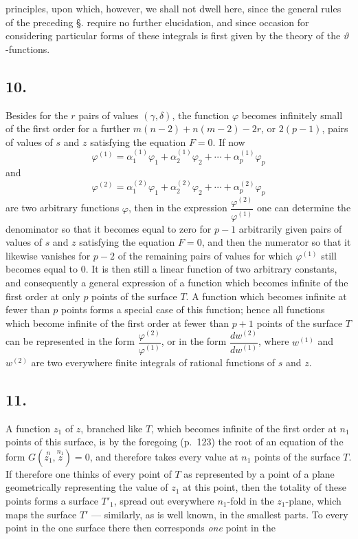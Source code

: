 \documentclass{article}
\begin{document}
principles, upon which, however, we shall not dwell here, since the general rules of the preceding §. require no further elucidation, and since occasion for considering particular forms of these integrals is first given by the theory of the $\vartheta$-functions.

\subsection*{10.}

Besides for the $r$ pairs of values $(\gamma, \delta)$, the function $\varphi$ becomes infinitely small of the first order for a further $m(n-2) + n(m-2) - 2r$, or $2(p-1)$, pairs of values of $s$ and $z$ satisfying the equation $F = 0$. If now
\[ \varphi^{(1)} = \alpha_{1}^{(1)}\varphi_{1} + \alpha_{2}^{(1)}\varphi_{2} + \cdots + \alpha_{p}^{(1)}\varphi_{p} \]
and
\[ \varphi^{(2)} = \alpha_{1}^{(2)}\varphi_{1} + \alpha_{2}^{(2)}\varphi_{2} + \cdots + \alpha_{p}^{(2)}\varphi_{p} \]
are two arbitrary functions $\varphi$, then in the expression $\dfrac{\varphi^{(2)}}{\varphi^{(1)}}$ one can determine the denominator so that it becomes equal to zero for $p-1$ arbitrarily given pairs of values of $s$ and $z$ satisfying the equation $F = 0$, and then the numerator so that it likewise vanishes for $p-2$ of the remaining pairs of values for which $\varphi^{(1)}$ still becomes equal to 0. It is then still a linear function of two arbitrary constants, and consequently a general expression of a function which becomes infinite of the first order at only $p$ points of the surface $T$. A function which becomes infinite at fewer than $p$ points forms a special case of this function; hence all functions which become infinite of the first order at fewer than $p+1$ points of the surface $T$ can be represented in the form $\dfrac{\varphi^{(2)}}{\varphi^{(1)}}$, or in the form $\dfrac{dw^{(2)}}{dw^{(1)}}$, where $w^{(1)}$ and $w^{(2)}$ are two everywhere finite integrals of rational functions of $s$ and $z$.

\subsection*{11.}

A function $z_{1}$ of $z$, branched like $T$, which becomes infinite of the first order at $n_{1}$ points of this surface, is by the foregoing (p.~123) the root of an equation of the form $G(\overset{n}{z_{1}}, \overset{n_{1}}{z}) = 0$, and therefore takes every value at $n_{1}$ points of the surface $T$. If therefore one thinks of every point of $T$ as represented by a point of a plane geometrically representing the value of $z_{1}$ at this point, then the totality of these points forms a surface $T'_{1}$, spread out everywhere $n_{1}$-fold in the $z_{1}$-plane, which maps the surface $T'$ --- similarly, as is well known, in the smallest parts. To every point in the one surface there then corresponds \emph{one} point in the
\end{document}
